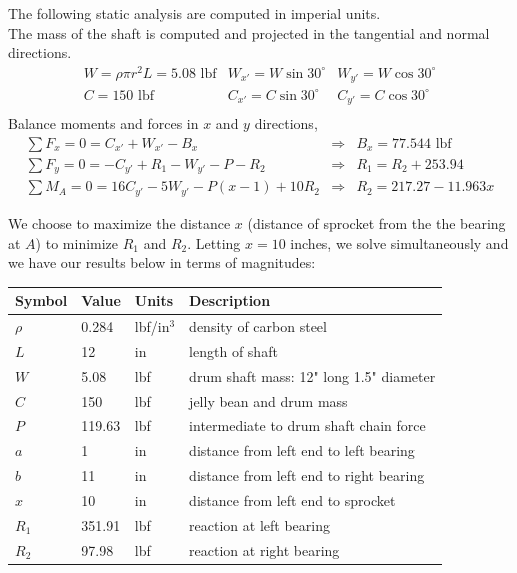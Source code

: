 \documentclass[letterpaper,12pt]{article}
\begin{document}
\noindent The following static analysis are computed in imperial units.\\
The mass of the shaft is computed and projected in the tangential and normal directions.
\[ \begin{array}{lll}%
 W = \rho \pi r^2 L = 5.08 \text{ lbf} &  W_{x'} = W\sin{30^\circ}  &  W_{y'} = W\cos{30^\circ}\\
C = 150 \text{ lbf} &  C_{x'} = C\sin{30^\circ} &  C_{y'} = C\cos{30^\circ}\\
\end{array}\]%
Balance moments and forces in $x$ and $y$ directions,
\[ \begin{array}{lll}%
 \sum F_x = 0 = C_{x'} + W_{x'} - B_{x} &\Rightarrow& B_{x} = 77.544 \text{ lbf}\\
 \sum F_y = 0 = -C_{y'} + R_1 - W_{y'} - P - R_2 &\Rightarrow& R_1 = R_2 + 253.94\\
 \sum M_{A} = 0 = 16C_{y'} - 5W_{y'} - P(x-1) + 10R_2 &\Rightarrow& R_2 = 217.27 - 11.963x
\end{array}\]%

\noindent We choose to maximize the distance $x$ (distance of sprocket from the the bearing at $A$) to minimize $R_1$ and $R_2$. Letting $x = 10$ inches, we solve simultaneously and we have our results below in terms of magnitudes:

\begin{center}
	\begin{tabular}{ |p{1.5cm}||p{1.5cm}|p{2cm}|p{7cm}|  }
		\hline
		Symbol & Value & Units & Description\\
		\hline
		$\rho$ & 0.284 & lbf/in$^3$ & density of carbon steel\\
	    $L$ & 12 & in & length of shaft\\
		\hline
		$W$ & 5.08 & lbf  & drum shaft mass: 12" long 1.5" diameter\\
        $C$ & 150 & lbf & jelly bean and drum mass\\
		$P$ & 119.63 & lbf  & intermediate to drum shaft chain force\\
		\hline
		$a$ & 1 & in  & distance from left end to left bearing\\
		$b$ & 11 & in  & distance from left end to right bearing\\
		$x$ & 10 & in  & distance from left end to sprocket \\
		\hline
		$R_1$ & 351.91 & lbf  & reaction at left bearing\\
		$R_2$ & 97.98 & lbf  & reaction at right bearing\\
		\hline
	\end{tabular}
\end{center}
\end{document}
